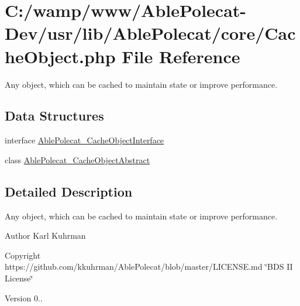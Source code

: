 \hypertarget{_cache_object_8php}{}\section{C\+:/wamp/www/\+Able\+Polecat-\/\+Dev/usr/lib/\+Able\+Polecat/core/\+Cache\+Object.php File Reference}
\label{_cache_object_8php}


Any object, which can be cached to maintain state or improve performance.  


\subsection*{Data Structures}
\begin{DoxyCompactItemize}
\item 
interface \hyperlink{interface_able_polecat___cache_object_interface}{Able\+Polecat\+\_\+\+Cache\+Object\+Interface}
\item 
class \hyperlink{class_able_polecat___cache_object_abstract}{Able\+Polecat\+\_\+\+Cache\+Object\+Abstract}
\end{DoxyCompactItemize}


\subsection{Detailed Description}
Any object, which can be cached to maintain state or improve performance. 

\begin{DoxyAuthor}{Author}
Karl Kuhrman 
\end{DoxyAuthor}
\begin{DoxyCopyright}{Copyright}
https\+://github.com/kkuhrman/\+Able\+Polecat/blob/master/\+L\+I\+C\+E\+N\+S\+E.\+md \char`\"{}\+B\+D\+S I\+I License\char`\"{} 
\end{DoxyCopyright}
\begin{DoxyVersion}{Version}
0.. 
\end{DoxyVersion}
